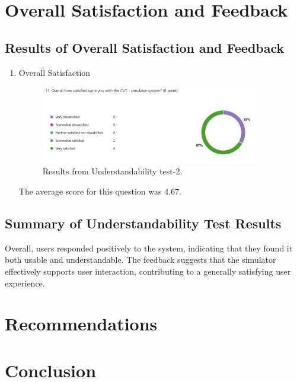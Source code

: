 \documentclass[12pt, titlepage]{article}
\begin{document}
  \section{Overall Satisfaction and Feedback}
  \subsection{Results of Overall Satisfaction and Feedback}
  \begin{enumerate}
    \item Overall Satisfaction
    \begin{figure}[H]  %
      \centering
      \includegraphics[width=0.9\textwidth]{overall.png}  %
      \caption{Results from Understandability test-2.}
      \label{fig:myimage}
    \end{figure}
    The average score for this question was 4.67.
  \end{enumerate}

\subsection{Summary of Understandability Test Results}

Overall, users responded positively to the system, indicating that they found it both usable and understandable. 
The feedback suggests that the simulator effectively supports user interaction, contributing to a generally satisfying user experience.
\section{Recommendations}

\section{Conclusion}

\newpage{}
\end{document}
